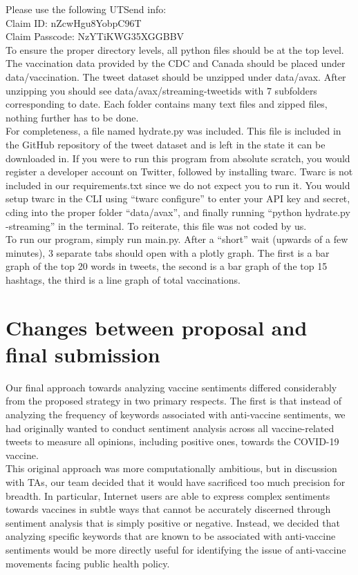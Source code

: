 \documentclass[fontsize=11pt]{article}
\begin{document}
Please use the following UTSend info: \\
Claim ID: nZcwHgu8YobpC96T \\
Claim Passcode: NzYTiKWG35XGGBBV \\

To ensure the proper directory levels, all python files should be at the top level. The vaccination data provided by the CDC and Canada should be placed under data/vaccination. The tweet dataset should be unzipped under data/avax. After unzipping you should see data/avax/streaming-tweetids with 7 subfolders corresponding to date. Each folder contains many text files and zipped files, nothing further has to be done. \\

For completeness, a file named hydrate.py was included. This file is included in the GitHub repository of the tweet dataset and is left in the state it can be downloaded in. If you were to run this program from absolute scratch, you would register a developer account on Twitter, followed by installing twarc. Twarc is not included in our requirements.txt since we do not expect you to run it. You would setup twarc in the CLI using “twarc configure” to enter your API key and secret, cding into the proper folder “data/avax”, and finally running “python hydrate.py -streaming” in the terminal. To reiterate, this file was not coded by us.\\

To run our program, simply run main.py. After a “short” wait (upwards of a few minutes), 3 separate tabs should open with a plotly graph. The first is a bar graph of the top 20 words in tweets, the second is a bar graph of the top 15 hashtags, the third is a line graph of total vaccinations.\\

\section*{Changes between proposal and final submission}
Our final approach towards analyzing vaccine sentiments differed considerably from the proposed strategy in two primary respects. The first is that instead of analyzing the frequency of keywords associated with anti-vaccine sentiments, we had originally wanted to conduct sentiment analysis across all vaccine-related tweets to measure all opinions, including positive ones, towards the COVID-19 vaccine. \\

This original approach was more computationally ambitious, but in discussion with TAs, our team decided that it would have sacrificed too much precision for breadth. In particular, Internet users are able to express complex sentiments towards vaccines in subtle ways that cannot be accurately discerned through sentiment analysis that is simply positive or negative. Instead, we decided that analyzing specific keywords that are known to be associated with anti-vaccine sentiments would be more directly useful for identifying the issue of anti-vaccine movements facing public health policy. \\
\end{document}
